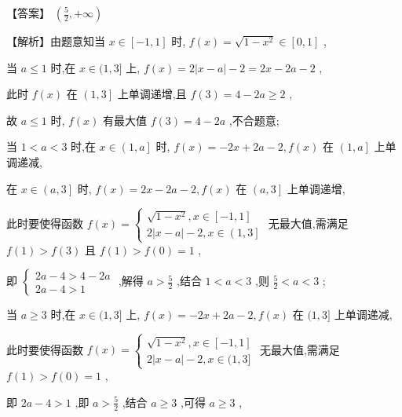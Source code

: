 \documentclass[10pt]{article}
\begin{document}
【答案】 \(\left( {\frac{5}{2}, + \infty }\right)\)

【解析】由题意知当 \(x \in  \left\lbrack  {-1,1}\right\rbrack\) 时, \(f\left( x\right)  = \sqrt{1 - {x}^{2}} \in  \left\lbrack  {0,1}\right\rbrack\) ,

当 \(a \leq  1\) 时,在 \(x \in  (1,3\rbrack\) 上, \(f\left( x\right)  = 2\left| {x - a}\right|  - 2 = {2x} - {2a} - 2\) ,

此时 \(f\left( x\right)\) 在 \(\left( {1,3}\right\rbrack\) 上单调递增,且 \(f\left( 3\right)  = 4 - {2a} \geq  2\) ,

故 \(a \leq  1\) 时, \(f\left( x\right)\) 有最大值 \(f\left( 3\right)  = 4 - {2a}\) ,不合题意;

当 \(1 < a < 3\) 时,在 \(x \in  \left( {1,a}\right\rbrack\) 时, \(f\left( x\right)  =  - {2x} + {2a} - 2,f\left( x\right)\) 在 \(\left( {1,a}\right\rbrack\) 上单调递减,

在 \(x \in  \left( {a,3}\right\rbrack\) 时, \(f\left( x\right)  = {2x} - {2a} - 2,f\left( x\right)\) 在 \(\left( {a,3}\right\rbrack\) 上单调递增,

此时要使得函数 \(f\left( x\right)  = \left\{  \begin{array}{l} \sqrt{1 - {x}^{2}},x \in  \left\lbrack  {-1,1}\right\rbrack  \\  2\left| {x - a}\right|  - 2,x \in  \left( {1,3}\right\rbrack   \end{array}\right.\) 无最大值,需满足 \(f\left( 1\right)  > f\left( 3\right)\) 且 \(f\left( 1\right)  > f\left( 0\right)  = 1\) ,

即 \(\left\{  \begin{array}{l} {2a} - 4 > 4 - {2a} \\  {2a} - 4 > 1 \end{array}\right.\) ,解得 \(a > \frac{5}{2}\) ,结合 \(1 < a < 3\) ,则 \(\frac{5}{2} < a < 3\) ;

当 \(a \geq  3\) 时,在 \(x \in  (1,3\rbrack\) 上, \(f\left( x\right)  =  - {2x} + {2a} - 2,f\left( x\right)\) 在 \((1,3\rbrack\) 上单调递减,

此时要使得函数 \(f\left( x\right)  = \left\{  \begin{array}{l} \sqrt{1 - {x}^{2}},x \in  \left\lbrack  {-1,1}\right\rbrack  \\  2\left| {x - a}\right|  - 2,x \in  (1,3\rbrack  \end{array}\right.\) 无最大值,需满足 \(f\left( 1\right)  > f\left( 0\right)  = 1\) ,

即 \({2a} - 4 > 1\) ,即 \(a > \frac{5}{2}\) ,结合 \(a \geq  3\) ,可得 \(a \geq  3\) ,
\end{document}
